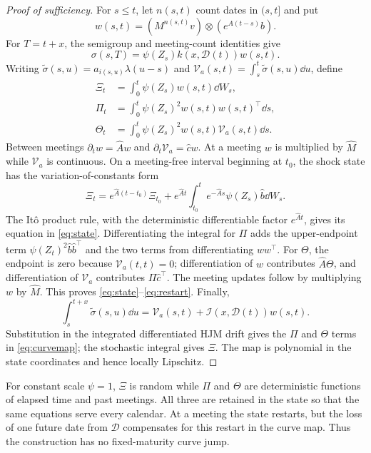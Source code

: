 \begin{proof}[Proof of sufficiency]
For $s\le t$, let $n(s,t)$ count dates in $(s,t]$ and put
\[
w(s,t)=(M^{n(s,t)}v)\otimes(e^{A(t-s)}b).
\]
For $T=t+x$, the semigroup and meeting-count identities give
\[
\sigma(s,T)=\psi(Z_s)k(x,\mathcal D(t))w(s,t).
\]
Writing $\widetilde\sigma(s,u)=a_{i(s,u)}\lambda(u-s)$ and $\mathcal V_a(s,t)=\int_s^t\widetilde\sigma(s,u)\dd u$, define
\begin{align*}
\Xi_t&=\int_0^t\psi(Z_s)w(s,t)\dd W_s,\\
\Pi_t&=\int_0^t\psi(Z_s)^2w(s,t)w(s,t)^\top\dd s,\\
\Theta_t&=\int_0^t\psi(Z_s)^2w(s,t)\mathcal V_a(s,t)\dd s.
\end{align*}
Between meetings $\partial_tw=\widehat Aw$ and $\partial_t\mathcal V_a=\widehat c w$. At a meeting $w$ is multiplied by $\widehat M$ while $\mathcal V_a$ is continuous. On a meeting-free interval beginning at $t_0$, the shock state has the variation-of-constants form
\[
\Xi_t=e^{\widehat A(t-t_0)}\Xi_{t_0}
 +e^{\widehat At}\int_{t_0}^t e^{-\widehat As}\psi(Z_s)\widehat b\dd W_s.
\]
The It\^o product rule, with the deterministic differentiable factor $e^{\widehat At}$, gives its equation in \eqref{eq:state}. Differentiating the integral for $\Pi$ adds the upper-endpoint term $\psi(Z_t)^2\widehat b\widehat b^\top$ and the two terms from differentiating $ww^\top$. For $\Theta$, the endpoint is zero because $\mathcal V_a(t,t)=0$; differentiation of $w$ contributes $\widehat A\Theta$, and differentiation of $\mathcal V_a$ contributes $\Pi\widehat c^\top$. The meeting updates follow by multiplying $w$ by $\widehat M$. This proves \eqref{eq:state}--\eqref{eq:restart}. Finally,
\[
\int_s^{t+x}\widetilde\sigma(s,u)\dd u
 =\mathcal V_a(s,t)+\mathcal I(x,\mathcal D(t))w(s,t).
\]
Substitution in the integrated differentiated HJM drift gives the $\Pi$ and $\Theta$ terms in \eqref{eq:curvemap}; the stochastic integral gives $\Xi$. The map is polynomial in the state coordinates and hence locally Lipschitz. 
\end{proof}

For constant scale $\psi=1$, $\Xi$ is random while $\Pi$ and $\Theta$ are deterministic functions of elapsed time and past meetings. All three are retained in the state so that the same equations serve every calendar. At a meeting the state restarts, but the loss of one future date from $\mathcal D$ compensates for this restart in the curve map. Thus the construction has no fixed-maturity curve jump.

